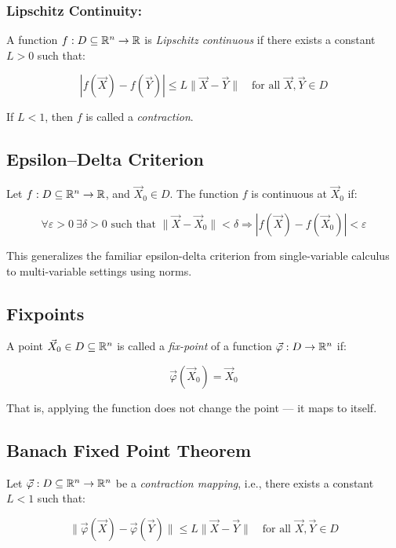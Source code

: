 \subsubsection{Lipschitz Continuity:}  

A function \( f : D \subseteq \mathbb{R}^n \to \mathbb{R} \) is \emph{Lipschitz continuous} if there 
exists a constant \( L > 0 \) such that:

\[
    |f(\vec{X}) - f(\vec{Y})| \le L \|\vec{X} - \vec{Y}\| \quad \text{for all } \vec{X}, \vec{Y} \in D
\]

If \( L < 1 \), then \(f\) is called a \emph{contraction}.

\subsection{Epsilon–Delta Criterion}

Let \( f : D \subseteq \mathbb{R}^n \to \mathbb{R} \), and \( \vec{X}_0 \in D \). The function 
\(f\) is continuous at \( \vec{X}_0 \) if:

\[
    \forall \varepsilon > 0 \ \exists \delta > 0 \text{ such that } \|\vec{X} - \vec{X}_0\| 
    < \delta \Rightarrow |f(\vec{X}) - f(\vec{X}_0)| < \varepsilon
\]

This generalizes the familiar epsilon-delta criterion from single-variable calculus to multi-variable 
settings using norms.

\subsection{Fixpoints}
  
A point \( \vec{X}_0 \in D \subseteq \mathbb{R}^n \) is called a \emph{fix-point} of a function 
\( \vec{\varphi} : D \to \mathbb{R}^n \) if:

\[
    \vec{\varphi}(\vec{X}_0) = \vec{X}_0
\]

That is, applying the function does not change the point — it maps to itself.

\subsection{Banach Fixed Point Theorem}

Let \( \vec{\varphi} : D \subseteq \mathbb{R}^n \to \mathbb{R}^n \) be a \emph{contraction mapping}, 
i.e., there exists a constant \( L < 1 \) such that:

\[
    \|\vec{\varphi}(\vec{X}) - \vec{\varphi}(\vec{Y})\| \le L \|\vec{X} - \vec{Y}\| \quad 
    \text{for all } \vec{X}, \vec{Y} \in D
\]

